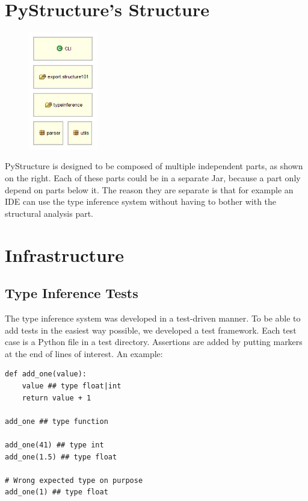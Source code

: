 \documentclass[12pt,halfparskip,DIV11,BCOR10mm]{scrreprt}
\begin{document}
\section{PyStructure's Structure}

\begin{figure}
    \vspace{-0.6cm}
    \includegraphics[width=3cm]{architecture/parts}
\end{figure}

PyStructure is designed to be composed of multiple independent parts, as shown on the right. Each of these parts could be in a separate Jar, because a part only depend on parts below it. The reason they are separate is that for example an IDE can use the type inference system without having to bother with the structural analysis part.



\section{Infrastructure}

\subsection{Type Inference Tests}

The type inference system was developed in a test-driven manner. To be able to add tests in the easiest way possible, we developed a test framework. Each test case is a Python file in a test directory. Assertions are added by putting markers at the end of lines of interest. An example:

\begin{lstlisting}
def add_one(value):
    value ## type float|int
    return value + 1

add_one ## type function

add_one(41) ## type int
add_one(1.5) ## type float

# Wrong expected type on purpose
add_one(1) ## type float
\end{lstlisting}
\end{document}

